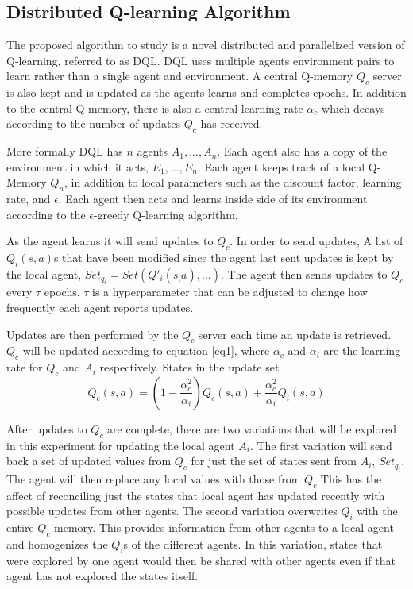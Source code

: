 \documentclass[jair,twoside,11pt,theapa]{article}
\begin{document}
\subsection{Distributed Q-learning Algorithm} 
\label{algorithm}
The proposed algorithm to study is a novel distributed and parallelized version of Q-learning, referred to as DQL. 
DQL uses multiple agents environment pairs to learn rather than a single agent and environment. A central Q-memory $Q_c$ server is also kept and is updated 
as the agents learns and completes epochs. In addition to the central Q-memory, there is also a central learning rate $\alpha_c$ which decays according
to the number of updates $Q_c$ has received. 

More formally DQL has $n$ agents $A_1, ... , A_n$. Each agent also has a copy of the environment in which it acts, $E_1, ..., E_n$. Each agent keeps track 
of a local Q-Memory $Q_n$, in addition to local parameters such as the discount factor, learning rate, and $\epsilon$. Each agent then acts and learns inside side of
its environment according to the $\epsilon$-greedy Q-learning algorithm. 

As the agent learns it will send updates to $Q_c$. In order to send updates, A list of $Q_i(s,a)$s that have been modified since the agent last sent updates is kept by the local agent,
$Set_{q_i} = Set(Q'_i(s_,a), ... )$.
The agent then sends updates to $Q_c$ every $\tau$ epochs. $\tau$ is a hyperparameter that can be adjusted to change how frequently each agent reports updates. 

Updates are then performed by the $Q_c$ server each time an update is retrieved. $Q_c$ will be updated according to equation \ref{eq1},
where $\alpha_{c}$ and $\alpha_i$ are the learning rate for $Q_c$ and $A_i$ respectively. States in the update set 
\begin{equation}
\label{eq1}
Q_c(s,a) = (1-\frac{\alpha_{c}^{2}}{\alpha_i})Q_c(s,a) + \frac{\alpha_{c}^{2}}{\alpha_i} Q_i(s,a)
\end{equation}

After updates to $Q_c$ are complete, there are two variations that will be explored in this experiment for updating the local agent $A_i$. 
The first variation will send back a set of updated values from $Q_c$ for just the set of states sent from $A_i$, $Set_{q_i}$. The agent will 
then replace any local values with those from $Q_c$ This has the affect of reconciling just the states that local agent has updated recently 
with possible updates from other agents. 
The second variation overwrites $Q_i$ with the entire $Q_c$ memory. This provides information from other agents to a local agent and homogenizes 
the $Q_i$s of the different agents. In this variation, states that were explored by one agent would then be shared with other agents even if that 
agent has not explored the states itself. 
\end{document}
